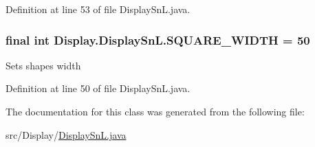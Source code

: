 Definition at line 53 of file Display\+Sn\+L.\+java.

\hypertarget{class_display_1_1_display_sn_l_acac8d594916c09aae69657f94c3e766d}{}
\subsubsection[{S\+Q\+U\+A\+R\+E\+\_\+\+W\+I\+D\+T\+H}]{\setlength{\rightskip}{0pt plus 5cm}final int Display.\+Display\+Sn\+L.\+S\+Q\+U\+A\+R\+E\+\_\+\+W\+I\+D\+T\+H = 50\hspace{0.3cm}{\ttfamily [static]}}\label{class_display_1_1_display_sn_l_acac8d594916c09aae69657f94c3e766d}
Sets shape\textquotesingle{}s width 

Definition at line 50 of file Display\+Sn\+L.\+java.



The documentation for this class was generated from the following file\+:\begin{DoxyCompactItemize}
\item 
src/\+Display/\hyperlink{_display_sn_l_8java}{Display\+Sn\+L.\+java}\end{DoxyCompactItemize}
